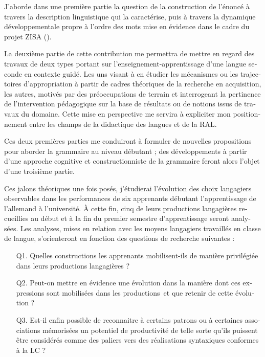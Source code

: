 \documentclass[output=paper]{langscibook}
\begin{document}
\begin{otherlanguage}{french}
J'aborde dans une première partie la question de la construction de l’énoncé à travers la description linguistique qui la caractérise, puis à travers la dynamique développementale propre à l’ordre des mots mise en évidence dans le cadre du projet ZISA (\citealt{MeiselEtAl1981, ClahsenEtAl1983}).

\begin{sloppypar}
La deuxième partie de cette contribution me permettra de mettre en regard des travaux de deux types portant sur l’enseignement-apprentissage d’une langue seconde en contexte guidé. Les uns visant à en étudier les mécanismes ou les trajectoires d’appropriation à partir de cadres théoriques de la recherche en acquisition, les autres, motivés par des préoccupations de terrain et interrogeant la pertinence de l’intervention pédagogique sur la base de résultats ou de notions issus de travaux du domaine. Cette mise en perspective me servira à expliciter mon positionnement entre les champs de la didactique des langues et de la RAL. 
\end{sloppypar}

Ces deux premières parties me conduiront à formuler de nouvelles propositions pour aborder la grammaire au niveau débutant ; des développements à partir d’une approche cognitive et constructionniste de la grammaire feront alors l’objet d’une troisième partie.

Ces jalons théoriques une fois posés, j'étudierai l’évolution des choix langagiers observables dans les performances de six apprenants débutant l’apprentissage de l’allemand à l’université. À cette fin, cinq de leurs productions langagières recueillies au début et à la fin du premier semestre d’apprentissage seront analysées. Les analyses, mises en relation avec les moyens langagiers travaillés en classe de langue, s’orienteront en fonction des questions de recherche suivantes : 

\begin{enumerate}\sloppy
\item[Q1.] Quelles constructions les apprenants mobilisent-ils de manière privilégiée dans leurs productions langagières ?

\item[Q2.] Peut-on mettre en évidence une évolution dans la manière dont ces expressions sont mobilisées dans les productions~et que retenir de cette évolution ?

\item[Q3.] Est-il enfin possible de reconnaitre à certains patrons ou à certaines associations mémorisées un potentiel de productivité de telle sorte qu’ils puissent être considérés comme des paliers vers des réalisations syntaxiques conformes à la LC ?
\end{enumerate}


\end{otherlanguage}
\end{document}
